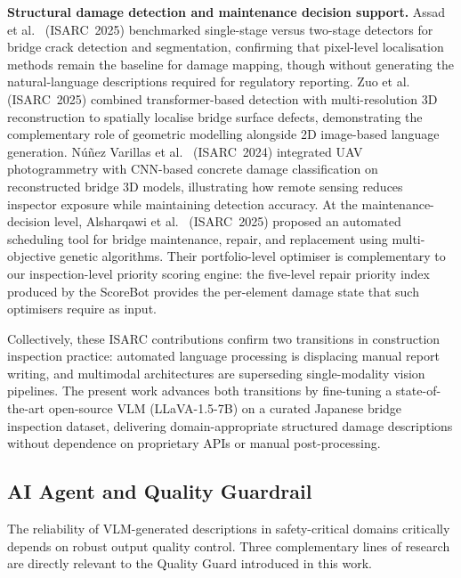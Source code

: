 \documentclass[twocolumn]{article}
\begin{document}
\textbf{Structural damage detection and maintenance decision support.}
Assad et al.~\cite{assad2025crack} (ISARC~2025) benchmarked
single-stage versus two-stage detectors for bridge crack detection
and segmentation, confirming that pixel-level localisation methods
remain the baseline for damage mapping, though without generating the
natural-language descriptions required for regulatory reporting.
Zuo et al.~\cite{zuo2025transformer} (ISARC~2025) combined
transformer-based detection with multi-resolution 3D reconstruction
to spatially localise bridge surface defects, demonstrating the
complementary role of geometric modelling alongside 2D image-based
language generation.
N\'{u}\~{n}ez Varillas et al.~\cite{nunez2024bridge} (ISARC~2024)
integrated UAV photogrammetry with CNN-based concrete damage
classification on reconstructed bridge 3D models, illustrating
how remote sensing reduces inspector exposure while maintaining
detection accuracy.
At the maintenance-decision level, Alsharqawi et al.~\cite{alsharqawi2025mrr}
(ISARC~2025) proposed an automated scheduling tool for bridge
maintenance, repair, and replacement using multi-objective genetic
algorithms.
Their portfolio-level optimiser is complementary to our inspection-level
priority scoring engine: the five-level repair priority index produced
by the ScoreBot provides the per-element damage state that such
optimisers require as input.

Collectively, these ISARC contributions confirm two transitions in
construction inspection practice: automated language processing is
displacing manual report writing, and multimodal architectures are
superseding single-modality vision pipelines.
The present work advances both transitions by fine-tuning a
state-of-the-art open-source VLM (LLaVA-1.5-7B) on a curated Japanese
bridge inspection dataset, delivering domain-appropriate structured
damage descriptions without dependence on proprietary APIs or
manual post-processing.

\subsection{AI Agent and Quality Guardrail}
\label{sec:related:guard}

The reliability of VLM-generated descriptions in safety-critical domains
critically depends on robust output quality control.
Three complementary lines of research are directly relevant to the
Quality Guard introduced in this work.
\end{document}

